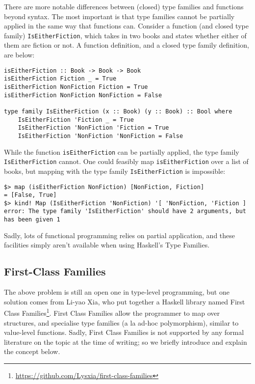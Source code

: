 \documentclass[12pt, a4paper, bibliography=totocnumbered]{scrreprt}
\newcommand{\inline}[1]{\lstinline[basicstyle=\ttfamily\footnotesize]{#1}}
\begin{document}
There are more notable differences between (closed) type families and functions beyond syntax. The most important is that type families cannot be partially applied in the same way that functions can. Consider a function (and closed type family) \inline{IsEitherFiction}, which takes in two books and states whether either of them are fiction or not. A function definition, and a closed type family definition, are below:

\begin{lstlisting}
isEitherFiction :: Book -> Book -> Book
isEitherFiction Fiction _ = True
isEitherFiction NonFiction Fiction = True
isEitherFiction NonFiction NonFiction = False

type family IsEitherFiction (x :: Book) (y :: Book) :: Bool where
    IsEitherFiction 'Fiction _ = True
    IsEitherFiction 'NonFiction 'Fiction = True
    IsEitherFiction 'NonFiction 'NonFiction = False
\end{lstlisting}

While the function \inline{isEitherFiction} can be partially applied, the type family \inline{IsEitherFiction} cannot. One could feasibly map \inline{isEitherFiction} over a list of books, but mapping with the type family \inline{IsEitherFiction} is impossible:

\begin{lstlisting}
$> map (isEitherFiction NonFiction) [NonFiction, Fiction]
= [False, True]
$> kind! Map (IsEitherFiction 'NonFiction) '[ 'NonFiction, 'Fiction ]
error: The type family 'IsEitherFiction' should have 2 arguments, but has been given 1
\end{lstlisting}

Sadly, lots of functional programming relies on partial application, and these facilities simply aren't available when using Haskell's Type Families.

\subsection{First-Class Families}

The above problem is still an open one in type-level programming, but one solution comes from Li-yao Xia, who put together a Haskell library named First Class Families\footnote{\url{https://github.com/Lysxia/first-class-families}}. First Class Families allow the programmer to map over structures, and specialise type families (a la ad-hoc polymorphism), similar to value-level functions. Sadly, First Class Families is not supported by any formal literature on the topic at the time of writing; so we briefly introduce and explain the concept below.
\end{document}

